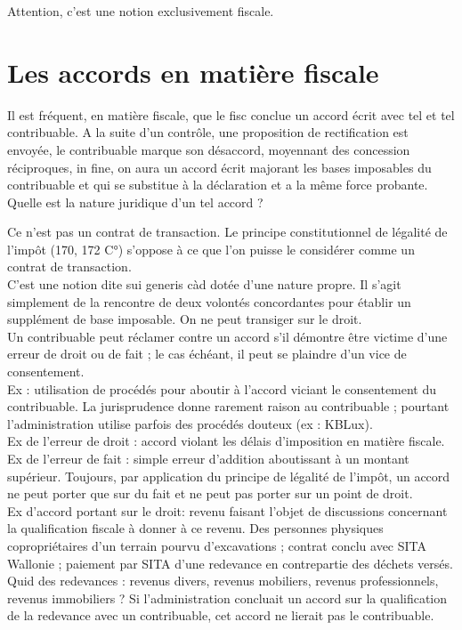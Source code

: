 \documentclass{book}
\begin{document}
Attention, c’est une notion exclusivement fiscale. 

\section{Les accords en matière fiscale}
Il est fréquent, en matière fiscale, que le fisc conclue un accord écrit avec tel et tel contribuable. A la suite d’un contrôle, une proposition de rectification est envoyée, le contribuable marque son désaccord, moyennant des concession réciproques, in fine, on aura un accord écrit majorant les bases imposables du contribuable et qui se substitue à la déclaration et a la même force probante. \\

Quelle est la nature juridique d’un tel accord ?

Ce n’est pas un contrat de transaction. Le principe constitutionnel de légalité de l’impôt (170, 172 C°) s’oppose à ce que l’on puisse le considérer comme un contrat de transaction.\\

C’est une notion dite sui generis càd dotée d’une nature propre. Il s’agit simplement de la rencontre de deux volontés concordantes pour établir un supplément de base imposable. On ne peut transiger sur le droit.\\ 

Un contribuable peut réclamer contre un accord s’il démontre être victime d’une erreur de droit ou de fait ; le cas échéant, il peut se plaindre d’un vice de consentement.\\

Ex : utilisation de procédés pour aboutir à l’accord viciant le consentement du contribuable.
La jurisprudence donne rarement raison au contribuable ; pourtant l’administration utilise parfois des procédés douteux (ex : KBLux). \\

Ex de l’erreur de droit : accord violant les délais d’imposition en matière fiscale.\\

Ex de l’erreur de fait : simple erreur d’addition aboutissant à un montant supérieur. 
Toujours, par application du principe de légalité de l’impôt, un accord ne peut porter que sur du fait et ne peut pas porter sur un point de droit. \\

Ex d’accord portant sur le droit: revenu faisant l’objet de discussions concernant la qualification fiscale à donner à ce revenu. Des personnes physiques copropriétaires d’un terrain pourvu d’excavations ; contrat conclu avec SITA Wallonie ; paiement par SITA d’une redevance en contrepartie des déchets versés. Quid des redevances : revenus divers, revenus mobiliers, revenus professionnels, revenus immobiliers ? Si l’administration concluait un accord sur la qualification de la redevance avec un contribuable, cet accord ne lierait pas le contribuable.  \\
\end{document}
